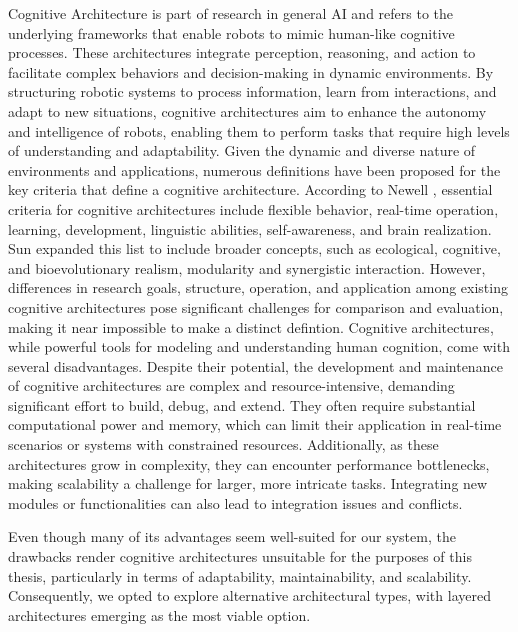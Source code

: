 \documentclass[%
paper=A4,               %
twoside=true,           %
openright,              %
11pt,                   %
bibliography=totoc,     %
titlepage=on,           %
DIV=12,                 %
BCOR=1.5cm,             %
parskip=half,            %
final
]{scrreprt}
\begin{document}
	Cognitive Architecture is part of research in general AI and refers to the underlying frameworks that enable robots to mimic human-like cognitive processes. These architectures integrate perception, reasoning, and action to facilitate complex behaviors and decision-making in dynamic environments. By structuring robotic systems to process information, learn from interactions, and adapt to new situations, cognitive architectures aim to enhance the autonomy and intelligence of robots, enabling them to perform tasks that require high levels of understanding and adaptability.  \autocite{kotseruba40YearsCognitive2020} Given the dynamic and diverse nature of environments and applications, numerous definitions have been proposed for the key criteria that define a cognitive architecture. According to Newell \autocite{newellPrecisUnifiedTheories1992}, essential criteria for cognitive architectures include flexible behavior, real-time operation, learning, development, linguistic abilities, self-awareness, and brain realization. Sun \autocite{sunDesiderataCognitiveArchitectures2004} expanded this list to include broader concepts, such as ecological, cognitive, and bioevolutionary realism, modularity and synergistic interaction. However, differences in research goals, structure, operation, and application among existing cognitive architectures pose significant challenges for comparison and evaluation, making it near impossible to make a distinct defintion.  \autocite{kotseruba40YearsCognitive2020} Cognitive architectures, while powerful tools for modeling and understanding human cognition, come with several disadvantages. Despite their potential, the development and maintenance of cognitive architectures are complex and resource-intensive, demanding significant effort to build, debug, and extend. They often require substantial computational power and memory, which can limit their application in real-time scenarios or systems with constrained resources. Additionally, as these architectures grow in complexity, they can encounter performance bottlenecks, making scalability a challenge for larger, more intricate tasks. Integrating new modules or functionalities can also lead to integration issues and conflicts. \autocite{langleyCognitiveArchitecturesResearch2009, kotseruba40YearsCognitive2020} \newline
	
	Even though many of its advantages seem well-suited for our system, the drawbacks render cognitive architectures unsuitable for the purposes of this thesis, particularly in terms of adaptability, maintainability, and scalability. Consequently, we opted to explore alternative architectural types, with layered architectures emerging as the most viable option.
		
\end{document}
